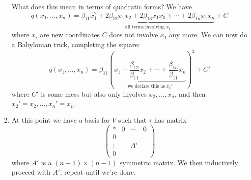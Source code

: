\documentclass[a4paper]{article}
\theoremstyle{definition}
\begin{document}
\begin{enumerate}
What does this mean in terms of quadratic forms? We have
\[
q(x_1,\ldots,x_n)=\underbrace{\beta_{11}x_1^2+2\beta_{12}x_1x_2+2\beta_{13}x_1x_3+\cdots +2\beta_{1n}x_1x_n}_{\text{all terms involving }x_{1}}+C
\]
where $x_i$ are new coordinates $C$ does not involve $x_1$ any more. We can now do a Babylonian trick, completing the square:
\[
q(x_1,\ldots,x_n) = \beta_{11} \left(\underbrace{x_1+\frac{\beta_{12}}{\beta_{11}}x_2+\cdots+\frac{\beta_{1n}}{\beta_{11}}x_n}_{\text{we declare this as }x_1'} \right)^2 +C'
\]
where $C'$ is some mess but also only involves $x_2,\ldots,x_n$, and then $x_2'=x_2,\ldots,x_n'=x_n$.

\item At this point we have a basis for $V$ such that $\tau$ has matrix
\[
\begin{pmatrix}\ast & 0 & \cdots & 0 \\ 0 \\ \vdots & & A' \\ 0\end{pmatrix}
\]
where $A'$ is a $(n-1)\times (n-1)$ symmetric matrix. We then inductively proceed with $A'$, repeat until we're done.
\end{enumerate}
\end{document}
